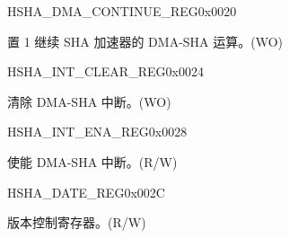 \begin{register}{H}{SHA\_DMA\_CONTINUE\_REG}{0x0020}\label{regdesc:SHADMACONTINUEREG}
%
%
\regnewline%
\begin{regdesc}\begin{reglist}
\label{fielddesc:SHADMACONTINUE}\item [SHA\_DMA\_CONTINUE] 置 1 继续 SHA 加速器的 DMA-SHA 运算。(WO)
\end{reglist}\end{regdesc}
\end{register}


\begin{register}{H}{SHA\_INT\_CLEAR\_REG}{0x0024}\label{regdesc:SHAINTCLEARREG}
%
%
\regnewline%
\begin{regdesc}\begin{reglist}
\label{fielddesc:SHACLEARINTERRUPT}\item [SHA\_CLEAR\_INTERRUPT] 清除 DMA-SHA 中断。(WO)
\end{reglist}\end{regdesc}
\end{register}


\begin{register}{H}{SHA\_INT\_ENA\_REG}{0x0028}\label{regdesc:SHAINTENAREG}
%
%
\regnewline%
\begin{regdesc}\begin{reglist}
\label{fielddesc:SHAINTERRUPTENA}\item [SHA\_INTERRUPT\_ENA] 使能 DMA-SHA 中断。(R/W)
\end{reglist}\end{regdesc}
\end{register}


\begin{register}{H}{SHA\_DATE\_REG}{0x002C}\label{regdesc:SHADATEREG}
%
%
\regnewline%
\begin{regdesc}\begin{reglist}
\label{fielddesc:SHADATE}\item [SHA\_DATE] 版本控制寄存器。(R/W)
\end{reglist}\end{regdesc}
\end{register}


